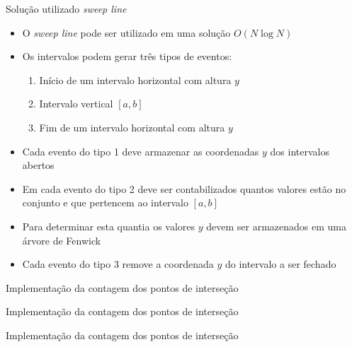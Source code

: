 \begin{frame}[fragile]{Solução utilizado \textit{sweep line}}

    \begin{itemize}
        \item O \textit{sweep line} pode ser utilizado em uma solução $O(N\log N)$

        \item Os intervalos podem gerar três tipos de eventos:
        \begin{enumerate}
            \item Início de um intervalo horizontal com altura $y$
            \item Intervalo vertical $[a, b]$
            \item Fim de um intervalo horizontal com altura $y$
        \end{enumerate}

        \item Cada evento do tipo 1 deve armazenar as coordenadas $y$ dos intervalos abertos

        \item Em cada evento do tipo 2 deve ser contabilizados quantos valores estão no conjunto
            e que pertencem ao intervalo $[a, b]$

        \item Para determinar esta quantia os valores $y$ devem ser armazenados em uma árvore
            de Fenwick

        \item Cada evento do tipo 3 remove a coordenada $y$ do intervalo a ser fechado
            
    \end{itemize}

\end{frame}



\begin{frame}[fragile]{Implementação da contagem dos pontos de interseção}
\end{frame}

\begin{frame}[fragile]{Implementação da contagem dos pontos de interseção}
\end{frame}

\begin{frame}[fragile]{Implementação da contagem dos pontos de interseção}
\end{frame}

